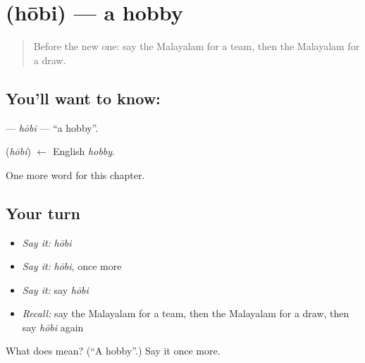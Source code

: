 \section[\texorpdfstring{\ml{ഹോബി} (hōbi)}{ഹോബി (hōbi)}]{ (hōbi) — a hobby}

\label{lesson:ML-C215-hobi}



\begin{quote}
Before the new one: say the Malayalam for a team, then the Malayalam for a draw.
\end{quote}

\subsection*{You'll want to know: }
\textbf{} — \emph{hōbi} — \textquotedblleft{}a hobby\textquotedblright{}.

\begin{cousinweb}
\textbf{} (\emph{hōbi}) $\leftarrow$ English \emph{hobby}.
\end{cousinweb}

\begin{grammarlens}[title={What you've built}]
One more word for this chapter.
\end{grammarlens}

\subsection*{Your turn}
\begin{itemize}
\raggedright
  \item \emph{Say it:} \emph{hōbi}
  \item \emph{Say it:} \emph{hōbi}, once more
  \item \emph{Say it:} say \emph{hōbi}
  \item \emph{Recall:} say the Malayalam for a team, then the Malayalam for a draw, then say \emph{hōbi} again
\end{itemize}

\begin{tcolorbox}[breakable,colback=teal!4,colframe=teal!35!black,title={Before you move on}]
What does  mean? (\textquotedblleft{}A hobby\textquotedblright{}.) Say it once more.
\end{tcolorbox}
